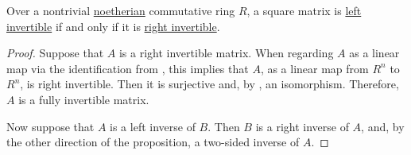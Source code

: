 \begin{proposition}\label{thm:square_matrix_left_invertible_iff_right_invertible}
  Over a nontrivial \hyperref[def:noetherian_semiring]{noetherian} commutative ring \( R \), a square matrix is \hyperref[def:inverse_matrix]{left invertible} if and only if it is \hyperref[def:inverse_matrix]{right invertible}.
\end{proposition}
\begin{proof}
  \NecessitySubProof Suppose that \( A \) is a right invertible matrix. When regarding \( A \) as a linear map via the identification from , this implies that \( A \), as a linear map from \( R^n \) to \( R^n \), is right invertible. Then it is surjective and, by , an isomorphism. Therefore, \( A \) is a fully invertible matrix.

  \SufficiencySubProof Now suppose that \( A \) is a left inverse of \( B \). Then \( B \) is a right inverse of \( A \), and, by the other direction of the proposition, a two-sided inverse of \( A \).
\end{proof}

